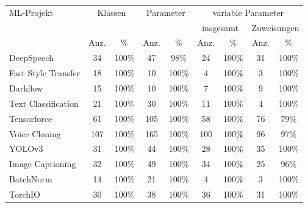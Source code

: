 \documentclass[german,bachelor]{swsLeipzig}
\begin{document}
\begin{table}[H]
\small
\begin{center}
\setlength{\tabcolsep}{5pt}
\begin{tabular}[h]{l|c|c|c|c|c|c|c|c} %
\hline
\multirow{3}{*}{ML-Projekt} & \multicolumn{2}{c|}{\multirow{2}{*}{Klassen}}  & \multicolumn{2}{c|}{\multirow{2}{*}{Parameter}}      &   \multicolumn{4}{c}{variable Parameter}\\
                            & \multicolumn{2}{c|}{}         & \multicolumn{2}{c|}{}             & \multicolumn{2}{c|}{insgesamt}    &  \multicolumn{2}{c}{Zuweisungen} \\
                            & Anz.      & \%                & Anz.      & \%                    & Anz.      & \%    & Anz.          & \% \\
\hline \hline
DeepSpeech                  & 34        & 100\%             & 47        & 98\%                 & 24        & 100\% & 31            & 100\%\\
Fast Style Transfer         & 18        & 100\%             & 10        & 100\%                 & 4         & 100\% & 3             & 100\%\\
Darkflow                    & 15        & 100\%             & 10        & 100\%                 & 7         & 100\% & 9             & 100\%\\
Text Classification         & 21        & 100\%             & 30        & 100\%                 & 11        & 100\% & 4             & 100\%\\
Tensorforce                 & 61        & 100\%             & 105       & 100\%                 & 58        & 100\% & 76            & 79\%\\
\hline
Voice Cloning               & 107       & 100\%             & 165       & 100\%                 & 100       & 100\% & 96            & 97\%\\
YOLOv3                      & 31        & 100\%             & 44        & 100\%                 & 28        & 100\% & 35            & 100\%\\
Image Captioning            & 32        & 100\%             & 49        & 100\%                 & 34        & 100\% & 25            & 96\%\\
BatchNorm                   & 14        & 100\%             & 21        & 100\%                 & 4         & 100\% & 3             & 100\%\\
TorchIO                     & 30        & 100\%             & 38        & 100\%                 & 36        & 100\% & 31            & 100\%\\

\end{tabular}
\end{center}
\end{table}
\end{document}
